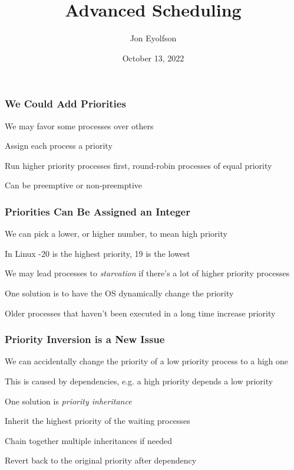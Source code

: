 

\title{Advanced Scheduling}
\author{Jon Eyolfson}
\date{October 13, 2022}


  \begin{frame}
    \titlepage
  \end{frame}

  \begin{frame}
    \frametitle{We Could Add Priorities}

    We may favor some processes over others

    \hspace{2em} Assign each process a priority

    \vspace{2em}

    Run higher priority processes first, round-robin processes of equal priority

    \hspace{2em} Can be preemptive or non-preemptive
  \end{frame}

  \begin{frame}
    \frametitle{Priorities Can Be Assigned an Integer}

    We can pick a lower, or higher number, to mean high priority

    \hspace{2em} In Linux -20 is the highest priority, 19 is the lowest

    \vspace{2em}

    We may lead processes to \textit{starvation} if there's a lot of higher
    priority processes

    \vspace{2em}

    One solution is to have the OS dynamically change the priority

    \hspace{2em} Older processes that haven't been executed in a long time increase priority
  \end{frame}

  \begin{frame}
    \frametitle{Priority Inversion is a New Issue}

    We can accidentally change the priority of a low priority process to a high one

    \hspace{2em} This is caused by dependencies, e.g. a high priority depends a low priority

    \vspace{2em}

    One solution is \textit{priority inheritance}

    \hspace{2em} Inherit the highest priority of the waiting processes

    \hspace{2em} Chain together multiple inheritances if needed

    \hspace{2em} Revert back to the original priority after dependency
  \end{frame}

